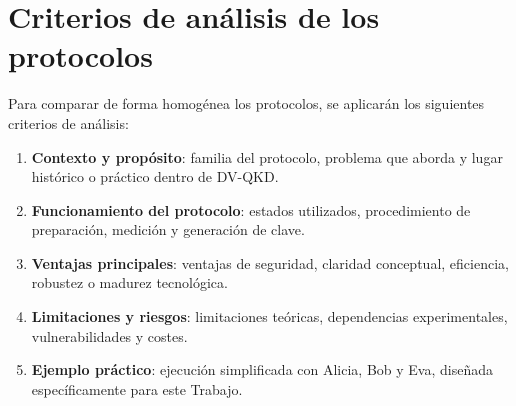 \section{Criterios de análisis de los protocolos}

Para comparar de forma homogénea los protocolos, se aplicarán los siguientes criterios de análisis:

\begin{enumerate}
    \item \textbf{Contexto y propósito}: familia del protocolo, problema que aborda y lugar histórico o práctico dentro de DV-QKD.
    \item \textbf{Funcionamiento del protocolo}: estados utilizados, procedimiento de preparación, medición y generación de clave.
    \item \textbf{Ventajas principales}: ventajas de seguridad, claridad conceptual, eficiencia, robustez o madurez tecnológica.
    \item \textbf{Limitaciones y riesgos}: limitaciones teóricas, dependencias experimentales, vulnerabilidades y costes.
    \item \textbf{Ejemplo práctico}: ejecución simplificada con Alicia, Bob y Eva, diseñada específicamente para este Trabajo.
\end{enumerate}